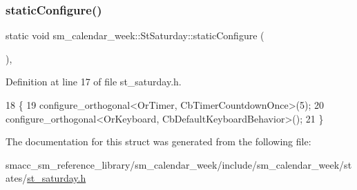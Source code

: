 \subsubsection{\texorpdfstring{static\+Configure()}{staticConfigure()}}
{\footnotesize\ttfamily static void sm\+\_\+calendar\+\_\+week\+::\+St\+Saturday\+::static\+Configure (\begin{DoxyParamCaption}{ }\end{DoxyParamCaption})\hspace{0.3cm}{\ttfamily [inline]}, {\ttfamily [static]}}



Definition at line 17 of file st\+\_\+saturday.\+h.


\begin{DoxyCode}
18     \{
19         configure\_orthogonal<OrTimer,  CbTimerCountdownOnce>(5);   
20         configure\_orthogonal<OrKeyboard, CbDefaultKeyboardBehavior>();
21     \}
\end{DoxyCode}


The documentation for this struct was generated from the following file\+:\begin{DoxyCompactItemize}
\item 
smacc\+\_\+sm\+\_\+reference\+\_\+library/sm\+\_\+calendar\+\_\+week/include/sm\+\_\+calendar\+\_\+week/states/\hyperlink{st__saturday_8h}{st\+\_\+saturday.\+h}\end{DoxyCompactItemize}
